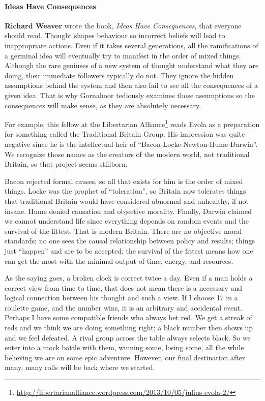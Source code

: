 \paragraph{Ideas Have Consequences}


\textbf{Richard Weaver} wrote the book, \emph{Ideas Have Consequences}, that everyone should read. Thought shapes behaviour so incorrect beliefs will lead to inappropriate actions. Even if it takes several generations, all the ramifications of a germinal idea will eventually try to manifest in the order of mixed things. Although the rare geniuses of a new system of thought understand what they are doing, their immediate followers typically do not. They ignore the hidden assumptions behind the system and then also fail to see all the consequences of a given idea. That is why Gornahoor tediously examines those assumptions so the consequences will make sense, as they are absolutely necessary.

For example, this fellow at the Libertarian Alliance\footnote{\url{http://libertarianalliance.wordpress.com/2013/10/05/julius-evola-2/}} reads Evola as a preparation for something called the Traditional Britain Group. His impression was quite negative since he is the intellectual heir of ``Bacon-Locke-Newton-Hume-Darwin''. We recognize those names as the creators of the modern world, not traditional Britain, so that project seems stillborn.

Bacon rejected formal causes, so all that exists for him is the order of mixed things. Locke was the prophet of ``toleration'', so Britain now tolerates things that traditional Britain would have considered abnormal and unhealthy, if not insane. Hume denied causation and objective morality. Finally, Darwin claimed we cannot understand life since everything depends on random events and the survival of the fittest. That is modern Britain. There are no objective moral standards; no one sees the causal relationship between policy and results; things just ``happen'' and are to be accepted; the survival of the fittest means how one can get the most with the minimal output of time, energy, and resources.

As the saying goes, a broken clock is correct twice a day. Even if a man holds a correct view from time to time, that does not mean there is a necessary and logical connection between his thought and such a view. If I choose 17 in a roulette game, and the number wins, it is an arbitrary and accidental event. Perhaps I have some compatible friends who always bet red. We get a streak of reds and we think we are doing something right; a black number then shows up and we feel defeated. A rival group across the table always selects black. So we enter into a mock battle with them, winning some, losing some, all the while believing we are on some epic adventure. However, our final destination after many, many rolls will be back where we started.

